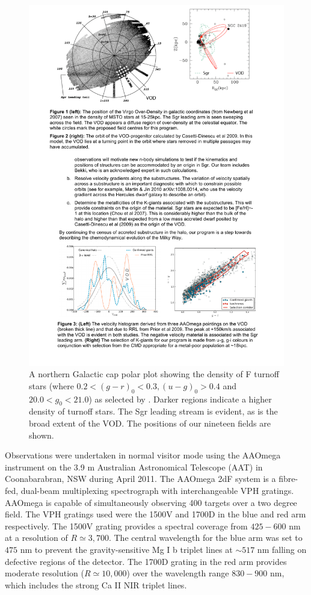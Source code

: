 \documentclass{emulateapj}
\begin{document}
\begin{figure}[h!]
	\includegraphics[width=\columnwidth]{./figures/fields.pdf}
	\caption{A northern Galactic cap polar plot showing the density of F turnoff stars (where $0.2 < (g - r)_0 < 0.3, (u - g)_0 > 0.4$ and $20.0 < g_0 < 21.0$) as selected by \citet{Newberg;et-al_2007}. Darker regions indicate a higher density of turnoff stars. The Sgr leading stream is evident, as is the broad extent of the VOD. The positions of our nineteen fields are shown.
	}
	\label{fig:target-fields}
\end{figure}

Observations were undertaken in normal visitor mode using the AAOmega instrument on the 3.9 m Australian Astronomical Telescope (AAT) in Coonabarabran, NSW during April 2011. The AAOmega 2dF system is a fibre-fed, dual-beam multiplexing spectrograph with interchangeable VPH gratings. AAOmega is capable of simultaneously observing 400 targets over a two degree field. The VPH gratings used were the 1500V and 1700D in the blue and red arm respectively. The 1500V grating provides a spectral coverage from $425-600$ nm at a resolution of $R \simeq 3,700$. The central wavelength for the blue arm was set to $475$ nm to prevent the gravity-sensitive Mg I b triplet lines at $\sim517$ nm falling on defective regions of the detector. The 1700D grating in the red arm provides moderate resolution ($R \simeq 10,000$) over the wavelength range $830-900$ nm, which includes the strong Ca II NIR triplet lines.
\end{document}
